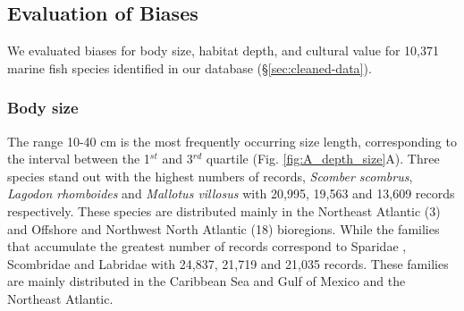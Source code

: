 \documentclass[12pt,authoryear]{elsarticle}
\begin{document}


\subsection{Evaluation of Biases}

We evaluated biases for body size, habitat depth, and cultural value for 10,371 marine fish species identified in our database (\S \ref{sec:cleaned-data}).

\subsubsection{Body size}
The range 10-40 cm is the most frequently occurring size length, corresponding to the interval between the 1$^{st}$ and 3$^{rd}$ quartile (Fig. \ref{fig:A_depth_size}A). Three species stand out with the highest numbers of records, \textit{Scomber scombrus}, \textit{Lagodon rhomboides} and \textit{Mallotus villosus}  with 20,995, 19,563 and 13,609 records respectively. These species are distributed mainly in the Northeast Atlantic (3) and Offshore and Northwest North Atlantic (18) bioregions. While the families that accumulate the greatest number of records correspond to Sparidae , Scombridae and Labridae with 24,837, 21,719 and 21,035 records. These families are mainly distributed in the Caribbean Sea and Gulf of Mexico and the Northeast Atlantic.  
\end{document}

